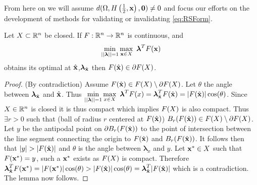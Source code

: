 From here on we will assume $d(\Omega,H\left(\frac{1}{2},\mathbf{x}\right),\mathbf{0})\neq 0$ and focus our efforts on the development of methods for validating or invalidating \ref{eq:RSForm}.

\begin{lem} 
\label{lem:BdOpt}
Let $X\subset\mathbb{R}^n$ be closed. If $F:\mathbb{R}^n\rightarrow\mathbb{R}^n$ is continuous, and 
$$\min\limits_{||\boldsymbol{\lambda}||=1}\max\limits_{\mathbf{x}\in X}\ \boldsymbol{\lambda}^TF(\mathbf{x})$$
obtains its optimal at $\hat{\mathbf{x}}$,$\boldsymbol{\lambda}_{\hat{\mathbf{x}}}$ then $F(\hat{\mathbf{x}})\in \partial F(X)$. 


\begin{proof} 
(By contradiction) Assume $F(\hat{\mathbf{x}})\in F(X)\setminus\partial F(X)$. 
Let $\theta$ the angle between $\boldsymbol{\lambda}_{\hat{\mathbf{x}}}$ and $\hat{\mathbf{x}}$. 
Thus $\min\limits_{||\boldsymbol{\lambda}||=1}\max\limits_{x\in X}\ \boldsymbol{\lambda}^T\vF(x)=\boldsymbol{\lambda}_{\hat{\vx}}^T\vF(\hat{\vx})=|\vF(\hat{\vx})|\cos(\theta)$. 
Since $X\in\mathbb{R}^n$ is closed it is thus compact which implies $F(X)$ is also compact. 
Thus $\exists r>0$ such that (ball of radius $r$ centered at $F(\hat{\mathbf{x}})$) $B_r(F(\hat{\mathbf{x}}))\in F(X)\setminus\partial F(X)$. 
Let $y$ be the antipodal point on $\partial B_r(F(\hat{\mathbf{x}}))$ to the point of intersection between the line segment connecting the origin to $F(\hat{\mathbf{x}})$ and $B_r(F(\hat{\mathbf{x}}))$. 
It follows then that $|y|>|\vF(\hat{\vx})|$ and $\theta$ is the angle between $\boldsymbol{\lambda}_x$ and $y$.   
Let $\mathbf{x}^*\in X$ such that $F(\mathbf{x}^*)=y$, such a $\mathbf{x}^*$ exists as $F(X)$ is compact. 
Therefore $\boldsymbol{\lambda}_{\hat{\mathbf{x}}}^TF(\mathbf{x}^*)=|F(\mathbf{x}^*)|\cos(\theta)>|F(\hat{\mathbf{x}})|\cos(\theta)=\boldsymbol{\lambda}_{\hat{\mathbf{x}}}^T|F(\hat{\mathbf{x}})|$ which is a contradiction. 
The lemma now follows.
\end{proof}
\end{lem}

